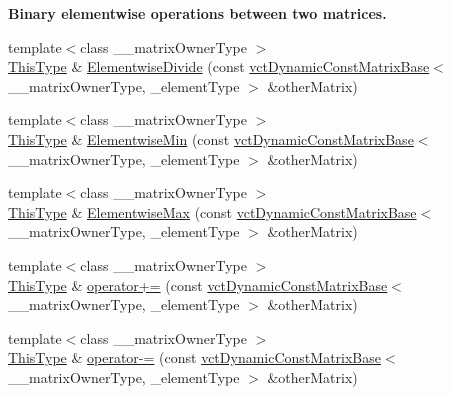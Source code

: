 \begin{Indent}{\bf Binary elementwise operations between two matrices.}
\begin{DoxyCompactItemize}
\item 
{\footnotesize template$<$class \+\_\+\+\_\+matrix\+Owner\+Type $>$ }\\\hyperlink{classvct_dynamic_const_matrix_base_ac4ff48cbe4d9de3fdef5a02447ffb9db}{This\+Type} \& \hyperlink{classvct_dynamic_matrix_base_a7be0d639e30525bfd8c4abfc39023b13}{Elementwise\+Divide} (const \hyperlink{classvct_dynamic_const_matrix_base}{vct\+Dynamic\+Const\+Matrix\+Base}$<$ \+\_\+\+\_\+matrix\+Owner\+Type, \+\_\+element\+Type $>$ \&other\+Matrix)
\item 
{\footnotesize template$<$class \+\_\+\+\_\+matrix\+Owner\+Type $>$ }\\\hyperlink{classvct_dynamic_const_matrix_base_ac4ff48cbe4d9de3fdef5a02447ffb9db}{This\+Type} \& \hyperlink{classvct_dynamic_matrix_base_aef9364af58997f201a1a3d56011e411c}{Elementwise\+Min} (const \hyperlink{classvct_dynamic_const_matrix_base}{vct\+Dynamic\+Const\+Matrix\+Base}$<$ \+\_\+\+\_\+matrix\+Owner\+Type, \+\_\+element\+Type $>$ \&other\+Matrix)
\item 
{\footnotesize template$<$class \+\_\+\+\_\+matrix\+Owner\+Type $>$ }\\\hyperlink{classvct_dynamic_const_matrix_base_ac4ff48cbe4d9de3fdef5a02447ffb9db}{This\+Type} \& \hyperlink{classvct_dynamic_matrix_base_a2c6d415e1bb9c356b9a843892b62b5c4}{Elementwise\+Max} (const \hyperlink{classvct_dynamic_const_matrix_base}{vct\+Dynamic\+Const\+Matrix\+Base}$<$ \+\_\+\+\_\+matrix\+Owner\+Type, \+\_\+element\+Type $>$ \&other\+Matrix)
\item 
{\footnotesize template$<$class \+\_\+\+\_\+matrix\+Owner\+Type $>$ }\\\hyperlink{classvct_dynamic_const_matrix_base_ac4ff48cbe4d9de3fdef5a02447ffb9db}{This\+Type} \& \hyperlink{classvct_dynamic_matrix_base_a733dcadf3529b4115cda4608cc2b9384}{operator+=} (const \hyperlink{classvct_dynamic_const_matrix_base}{vct\+Dynamic\+Const\+Matrix\+Base}$<$ \+\_\+\+\_\+matrix\+Owner\+Type, \+\_\+element\+Type $>$ \&other\+Matrix)
\item 
{\footnotesize template$<$class \+\_\+\+\_\+matrix\+Owner\+Type $>$ }\\\hyperlink{classvct_dynamic_const_matrix_base_ac4ff48cbe4d9de3fdef5a02447ffb9db}{This\+Type} \& \hyperlink{classvct_dynamic_matrix_base_a9612525d45c1ec8e22b2536ca80b1ac1}{operator-\/=} (const \hyperlink{classvct_dynamic_const_matrix_base}{vct\+Dynamic\+Const\+Matrix\+Base}$<$ \+\_\+\+\_\+matrix\+Owner\+Type, \+\_\+element\+Type $>$ \&other\+Matrix)
\end{DoxyCompactItemize}
\end{Indent}
